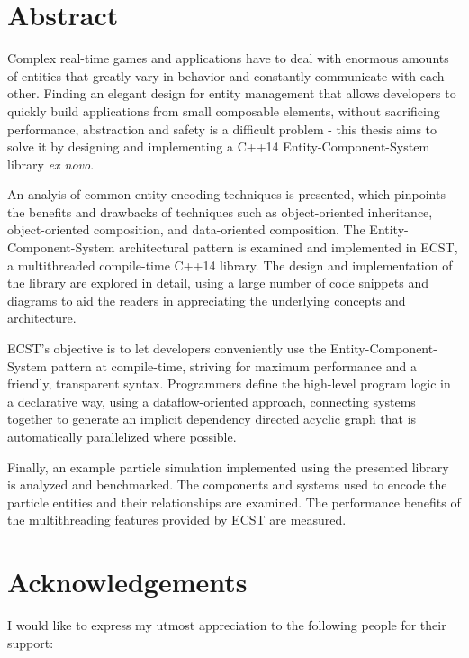 \documentclass[twoside, 12pt, a4paper, openright]{book}
\begin{document}
\chapter*{Abstract}\label{abstract}

Complex real-time games and applications have to deal with enormous
amounts of entities that greatly vary in behavior and constantly
communicate with each other. Finding an elegant design for entity
management that allows developers to quickly build applications from
small composable elements, without sacrificing performance, abstraction
and safety is a difficult problem - this thesis aims to solve it by
designing and implementing a C++14 Entity-Component-System library
\emph{ex novo}.

An analyis of common entity encoding techniques is presented, which
pinpoints the benefits and drawbacks of techniques such as
object-oriented inheritance, object-oriented composition, and
data-oriented composition. The Entity-Component-System architectural
pattern is examined and implemented in ECST, a multithreaded
compile-time C++14 library. The design and implementation of the library
are explored in detail, using a large number of code snippets and
diagrams to aid the readers in appreciating the underlying concepts and
architecture.

ECST's objective is to let developers conveniently use the
Entity-Component-System pattern at compile-time, striving for maximum
performance and a friendly, transparent syntax. Programmers define the
high-level program logic in a declarative way, using a dataflow-oriented
approach, connecting systems together to generate an implicit dependency
directed acyclic graph that is automatically parallelized where
possible.

Finally, an example particle simulation implemented using the presented
library is analyzed and benchmarked. The components and systems used to
encode the particle entities and their relationships are examined. The
performance benefits of the multithreading features provided by ECST are
measured.

\chapter*{Acknowledgements}\label{acknowledgements}

I would like to express my utmost appreciation to the following people
for their support:
\end{document}
